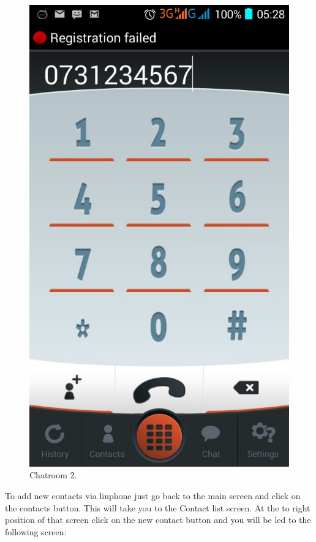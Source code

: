 \documentclass[a4paper]{article}
\begin{document}
\begin{center}
\begin{figure}[H]
\centering
\includegraphics[width=0.7\linewidth]{pictures/Screenshot_2015-08-04-05-38-27.png}
\caption{\label{fig:Screen6}Chatroom 2.}
\end{figure}
\end{center}

To add new contacts via linphone just go back to the main screen and click on the contacts button. This will take you to the Contact list screen. At the to right position of that screen click on the new contact button and you will be led to the following screen:
\end{document}
